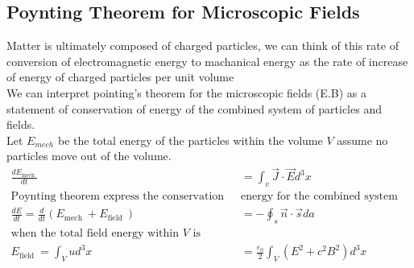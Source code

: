 \subsection{Poynting Theorem for Microscopic Fields}
Matter is ultimately composed of charged particles, we can think of this rate of conversion of electromagnetic energy to machanical energy as the rate of increase of energy of charged particles per unit volume\\
We can interpret pointing's theorem for the microscopic fields (E.B) as a statement of conservation of energy of the combined system of particles and fields.\\
Let $E_{mech}$ be the total energy of the particles within the volume $V$ assume no particles move out of the volume.
\begin{align*}
\frac{d E_{\text {mech }}}{d t}&=\int_{v} \vec{J} \cdot \vec{E} d^{3} x\\
\text{Poynting theorem express the conservation of }&\text{energy for the combined system as}\\
\frac{d E}{d t}=\frac{d}{d t}\left(E_{\text {mech }}+E_{\text {field }}\right)&=-\oint_{s} \vec{n} \cdot \vec{s} d a\\
\text{when the total field energy within $V$ is }\\
E_{\text {field } }=\int_{V} u d^{3} x&=\frac{\varepsilon_{0}}{2} \int_{V}\left(E^{2}+c^{2} B^{2}\right) d^{3} x
\end{align*}
